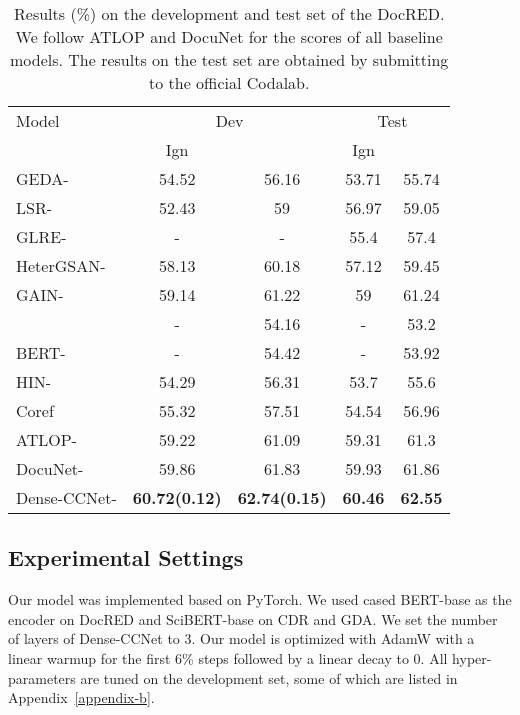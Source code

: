 \documentclass[11pt]{article}
\begin{document}
\begin{table*}[]
\centering
\begin{tabular}{lcccc}
\toprule
Model                & \multicolumn{2}{c}{Dev}   & \multicolumn{2}{c}{Test} \\ 
                     & Ign       &           & Ign      &           \\ [2pt] \toprule
GEDA-\cite{c:130}        & 54.52       & 56.16       & 53.71      & 55.74       \\
LSR- \cite{c:106}        & 52.43       & 59          & 56.97      & 59.05       \\
GLRE-\cite{c:108}        & -           & -           & 55.4       & 57.4        \\
HeterGSAN-\cite{c:134}  & 58.13       & 60.18       & 57.12      & 59.45       \\ 
GAIN-\cite{c:105}       & 59.14       & 61.22       & 59         & 61.24       \\
[2pt] \toprule
\cite{c:135}             & -           & 54.16       & -          & 53.2        \\
BERT-\cite{c:135}          & -           & 54.42       & -          & 53.92       \\
HIN-\cite{c:111}         & 54.29       & 56.31       & 53.7       & 55.6        \\
Coref\cite{c:146}        & 55.32       & 57.51       & 54.54      & 56.96       \\
ATLOP-\cite{c:112}       & 59.22       & 61.09       & 59.31      & 61.3        \\
DocuNet-\cite{c:113}     & 59.86       & 61.83       & 59.93      & 61.86       \\ [2pt] \toprule
Dense-CCNet- & \textbf{60.72(0.12)} & \textbf{62.74(0.15)} & \textbf{60.46} & \textbf{62.55} \\ \bottomrule


\end{tabular}
\caption{\label{tab1} Results (\%) on the development and test set of the DocRED. We follow ATLOP \cite{c:112} and DocuNet \cite{c:113} for the scores of all baseline models. The results on the test set are obtained by submitting to the official Codalab.
}
\end{table*}


\subsection{Experimental Settings}
Our model was implemented based on PyTorch. We used cased BERT-base \cite{c:125} as the encoder on DocRED and SciBERT-base \cite{c:127} on CDR and GDA.
We set the number of layers of Dense-CCNet to 3.
Our model is optimized with AdamW \cite{c:128} with a linear warmup \cite{c:129} for the first 6\% steps followed by a linear decay to 0. 
All hyper-parameters are tuned on the development set, some of which are listed in Appendix~\ref{appendix-b}.
\end{document}
